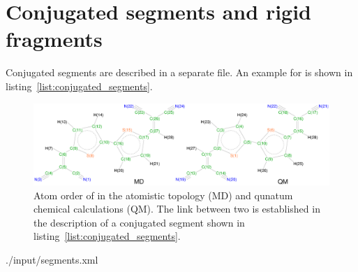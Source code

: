 \section{Conjugated segments and rigid fragments}

Conjugated segments are described in a separate \xml file. An example for \dcvt is shown in listing~\ref{list:conjugated_segments}.



\clearpage
\begin{figure}[ht]
\centering
\includegraphics[width=\textwidth]{./fig/chemical_structure/dcv2t_gaussian} 
\caption{\small Atom order of \dcvt in the atomistic topology (MD) and qunatum chemical calculations (QM). The  link between two is established in the description of a conjugated segment shown in listing~\ref{list:conjugated_segments}.}
\label{fig:dcv2t_qm}
\end{figure}


%
{./input/segments.xml}
\clearpage




